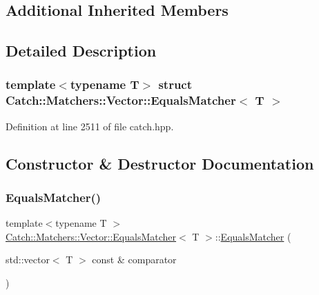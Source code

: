 \subsection*{Additional Inherited Members}


\subsection{Detailed Description}
\subsubsection*{template$<$typename T$>$\newline
struct Catch\+::\+Matchers\+::\+Vector\+::\+Equals\+Matcher$<$ T $>$}



Definition at line 2511 of file catch.\+hpp.



\subsection{Constructor \& Destructor Documentation}
\mbox{\label{struct_catch_1_1_matchers_1_1_vector_1_1_equals_matcher_a3846c47780d1991dcfe87aefded98008}} 
\subsubsection{\texorpdfstring{Equals\+Matcher()}{EqualsMatcher()}}
{\footnotesize\ttfamily template$<$typename T $>$ \\
\mbox{\hyperlink{struct_catch_1_1_matchers_1_1_vector_1_1_equals_matcher}{Catch\+::\+Matchers\+::\+Vector\+::\+Equals\+Matcher}}$<$ T $>$\+::\mbox{\hyperlink{struct_catch_1_1_matchers_1_1_vector_1_1_equals_matcher}{Equals\+Matcher}} (\begin{DoxyParamCaption}\item[{std\+::vector$<$ T $>$ const \&}]{comparator }\end{DoxyParamCaption})\hspace{0.3cm}{\ttfamily [inline]}}



